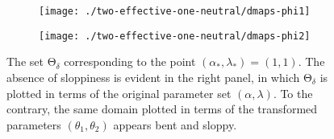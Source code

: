 \documentclass[11pt]{article}
\newcommand{\ps}{\mathrm{\Theta}}
\newcommand{\p}{\theta}
\begin{document}
\begin{figure}[ht!]
  \begin{subfigure}[t]{0.49\textwidth}
    \centering
    \texttt{[image: ./two-effective-one-neutral/dmaps-phi1]}
  \end{subfigure}
  \begin{subfigure}[t]{0.49\textwidth}
    \centering
    \texttt{[image: ./two-effective-one-neutral/dmaps-phi2]}
  \end{subfigure} %
  \caption{The set $\ps_\delta$ corresponding to the point
    $(\alpha_*,\lambda_*) = (1,1)$. The absence of
    sloppiness is evident in the right panel, in which $\ps_\delta$ is
    plotted in terms of the original parameter set
    $(\alpha,\lambda)$. To the contrary, the same domain plotted in
    terms of the transformed parameters $(\p_1,\p_2)$ appears bent and
    sloppy. \label{f.transf-params}}
\end{figure}

% 
% 
\end{document}
